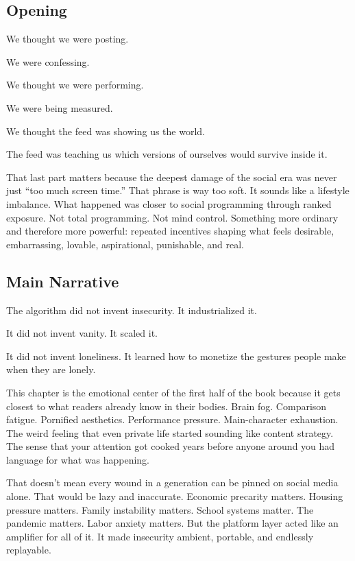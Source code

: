 \documentclass[
  american,
  12pt,
  letterpaper,
]{article}
\begin{document}
\subsection{Opening}\label{opening-2}

We thought we were posting.

We were confessing.

We thought we were performing.

We were being measured.

We thought the feed was showing us the world.

The feed was teaching us which versions of ourselves would survive
inside it.

That last part matters because the deepest damage of the social era was
never just ``too much screen time.'' That phrase is way too soft. It
sounds like a lifestyle imbalance. What happened was closer to social
programming through ranked exposure. Not total programming. Not mind
control. Something more ordinary and therefore more powerful: repeated
incentives shaping what feels desirable, embarrassing, lovable,
aspirational, punishable, and real.

\subsection{Main Narrative}\label{main-narrative-2}

The algorithm did not invent insecurity. It industrialized it.

It did not invent vanity. It scaled it.

It did not invent loneliness. It learned how to monetize the gestures
people make when they are lonely.

This chapter is the emotional center of the first half of the book
because it gets closest to what readers already know in their bodies.
Brain fog. Comparison fatigue. Pornified aesthetics. Performance
pressure. Main-character exhaustion. The weird feeling that even private
life started sounding like content strategy. The sense that your
attention got cooked years before anyone around you had language for
what was happening.

That doesn't mean every wound in a generation can be pinned on social
media alone. That would be lazy and inaccurate. Economic precarity
matters. Housing pressure matters. Family instability matters. School
systems matter. The pandemic matters. Labor anxiety matters. But the
platform layer acted like an amplifier for all of it. It made insecurity
ambient, portable, and endlessly replayable.
\end{document}
